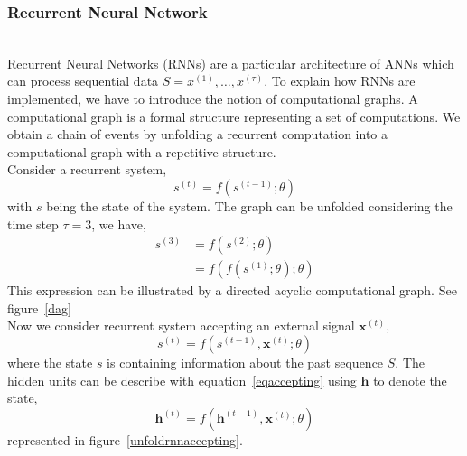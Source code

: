 
\subsubsection{Recurrent Neural Network}~\\

Recurrent Neural Networks (RNNs) are a particular architecture of ANNs which can
process sequential data $S = x^{(1)},\dots,x^{(\tau)}$. To explain how RNNs are
implemented, we have to introduce the notion of computational graphs.
A computational graph is a formal structure representing a set of computations.
We obtain a chain of events by unfolding a recurrent computation into a
computational graph with a repetitive structure. \\

Consider a recurrent system,
\begin{equation}
  s^{(t)} = f(s^{(t-1)};\theta)
\end{equation}
with $s$ being the state of the system. The graph can be unfolded considering
the time step $\tau = 3$, we have,
\begin{equation}
  \begin{split}
    s^{(3)} & = f(s^{(2)};\theta) \\
          & = f(f(s^{(1)};\theta);\theta)
  \end{split}
  \label{recurrentsystem}
\end{equation}
This expression can be illustrated by a directed acyclic computational graph.
See figure~\ref{dag}\\


Now we consider recurrent system accepting an external signal $\bm{x}^{(t)}$,
\begin{equation}
  s^{(t)} = f(s^{(t-1)},\bm{x}^{(t)};\theta)
  \label{eqaccepting}
\end{equation}
where the state $s$ is containing information about the past sequence $S$. The
hidden units can be describe with equation~\ref{eqaccepting} using $\bm{h}$ to
denote the state,
\begin{equation}
  \bm{h}^{(t)} = f(\bm{h}^{(t-1)},\bm{x}^{(t)};\theta)
\end{equation}
represented in figure~\ref{unfoldrnnaccepting}.\\



